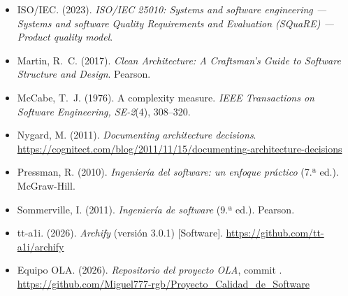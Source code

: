 \documentclass[11pt,a4paper]{article}
\begin{document}
\begin{itemize}[label={}, leftmargin=1.2em, itemindent=-1.2em, before=\raggedright]
  \item ISO/IEC. (2023). \emph{ISO/IEC 25010: Systems and software engineering — Systems and software Quality Requirements and Evaluation (SQuaRE) — Product quality model}.
  \item Martin, R.~C. (2017). \emph{Clean Architecture: A Craftsman's Guide to Software Structure and Design}. Pearson.
  \item McCabe, T.~J. (1976). A complexity measure. \emph{IEEE Transactions on Software Engineering, SE-2}(4), 308--320.
  \item Nygard, M. (2011). \emph{Documenting architecture decisions}. \url{https://cognitect.com/blog/2011/11/15/documenting-architecture-decisions}
  \item Pressman, R. (2010). \emph{Ingeniería del software: un enfoque práctico} (7.ª ed.). McGraw-Hill.
  \item Sommerville, I. (2011). \emph{Ingeniería de software} (9.ª ed.). Pearson.
  \item tt-a1i. (2026). \emph{Archify} (versión 3.0.1) [Software]. \url{https://github.com/tt-a1i/archify}
  \item Equipo OLA. (2026). \emph{Repositorio del proyecto OLA}, commit . \url{https://github.com/Miguel777-rgb/Proyecto_Calidad_de_Software}
\end{itemize}
\end{document}
